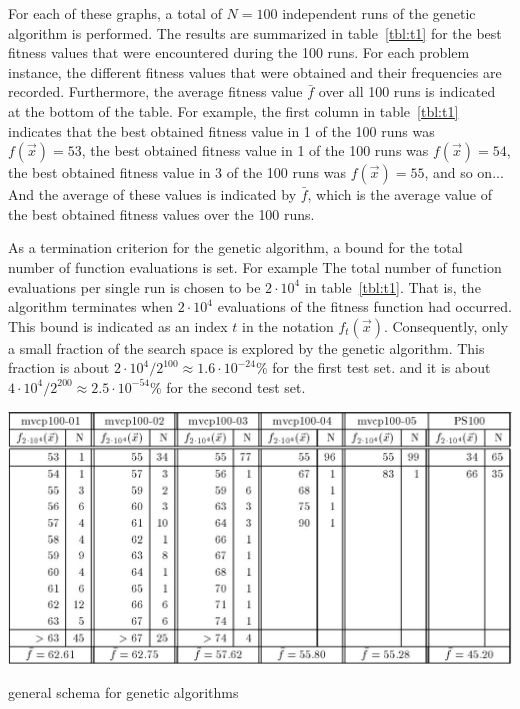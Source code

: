 \documentclass[12pt]{article}
\begin{document}
For each of these graphs, a total of
$N = 100$ independent runs of the genetic algorithm is performed.
The results are summarized in table~\ref{tbl:t1} for the best
fitness values that were encountered during the 100 runs.
For each problem instance, the different fitness values that were
obtained and their frequencies are recorded.
Furthermore, the average fitness value $\bar{f}$ over
all 100 runs is indicated at the bottom of the table.
For example, the first column in table~\ref{tbl:t1} indicates
that the best obtained fitness value in 1 of the 100 runs was $f(\vec{x}) = 53$,
the best obtained fitness value in 1 of the 100 runs was $f(\vec{x}) = 54$,
the best obtained fitness value in 3 of the 100 runs was $f(\vec{x}) = 55$, and so on...
And the average of these values is indicated by $\bar{f}$, which is the average value of
the best obtained fitness values over the 100 runs.

As a termination criterion for the genetic algorithm, a bound for the total number of function evaluations is set.
For example The total number of function evaluations per single run is chosen to be $2 \cdot 10^4$ in table~\ref{tbl:t1}.
That is, the algorithm terminates when $2 \cdot 10^4$ evaluations of the fitness function
had occurred.
This bound is indicated as an index $t$ in the notation $f_t(\vec{x})$.
Consequently, only a small fraction of the search space is explored by the genetic algorithm.
This fraction is about $ 2 \cdot 10^4 / 2^{100} \approx 1.6 \cdot 10^{-24} \% $ for the first test set.
and it is about $ 4 \cdot 10^4 / 2^{200} \approx 2.5 \cdot 10^{-54} \% $ for the second test set.

\begin{table}[!htbp]
\centering
\includegraphics[width=1\textwidth]{t1}
\caption{general schema for genetic algorithms}
\label{tbl:t1}
\end{table}
\end{document}

